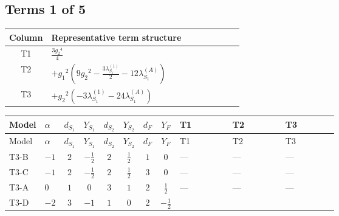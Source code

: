 \documentclass[8pt]{article}
\begin{document}
\begin{landscape}
\subsection*{Terms 1 of 5}
\begin{center}
\begin{tabular}{@{}c >{\raggedright\arraybackslash}p{0.82\linewidth}@{}}
\toprule
Column & Representative term structure \\
\midrule
T1 & \(\displaystyle \frac{3 {g_2}^4}{4}\) \\
\midrule
T2 & \(\displaystyle +{g_1}^2 \left(9 {g_2}^2-\frac{3 {\lambda_{S_1}^{(1)}}}{2}-12 {\lambda_{S_1}^{(A)}}\right)\) \\
\midrule
T3 & \(\displaystyle +{g_2}^2 (-3 {\lambda_{S_1}^{(1)}}-24 {\lambda_{S_1}^{(A)}})\) \\
\midrule
\bottomrule
\end{tabular}
\end{center}
\smallskip
\tiny
\begin{longtable}{@{}llcccccc >{\raggedright\arraybackslash}p{0.21\linewidth} >{\raggedright\arraybackslash}p{0.21\linewidth} >{\raggedright\arraybackslash}p{0.21\linewidth}@{}}
\toprule
Model & $\alpha$ & $d_{S_1}$ & $Y_{S_1}$ & $d_{S_2}$ & $Y_{S_2}$ & $d_F$ & $Y_F$ & T1 & T2 & T3 \\
\midrule
\endfirsthead
\toprule
Model & $\alpha$ & $d_{S_1}$ & $Y_{S_1}$ & $d_{S_2}$ & $Y_{S_2}$ & $d_F$ & $Y_F$ & T1 & T2 & T3 \\
\midrule
\endhead
T3-B & $-1$ & $2$ & $-\frac{1}{2}$ & $2$ & $\frac{1}{2}$ & $1$ & $0$ & --- & --- & --- \\
\midrule
T3-C & $-1$ & $2$ & $-\frac{1}{2}$ & $2$ & $\frac{1}{2}$ & $3$ & $0$ & --- & --- & --- \\
\midrule
T3-A & $0$ & $1$ & $0$ & $3$ & $1$ & $2$ & $\frac{1}{2}$ & --- & --- & --- \\
\midrule
T3-D & $-2$ & $3$ & $-1$ & $1$ & $0$ & $2$ & $-\frac{1}{2}$ & \scriptsize\adjustbox{max width=\linewidth}{$\begin{gathered} \frac{3 {g_2}^4}{4}\end{gathered}$} & \scriptsize\adjustbox{max width=\linewidth}{$\begin{gathered} +{g_1}^2 \left(9 {g_2}^2-\frac{3 {\lambda_{S_1}^{(1)}}}{2}-12 {\lambda_{S_1}^{(A)}}\right)\end{gathered}$} & \scriptsize\adjustbox{max width=\linewidth}{$\begin{gathered} +{g_2}^2 (-3 {\lambda_{S_1}^{(1)}}-24 {\lambda_{S_1}^{(A)}})\end{gathered}$} \\

\end{longtable}
\end{landscape}
\end{document}
